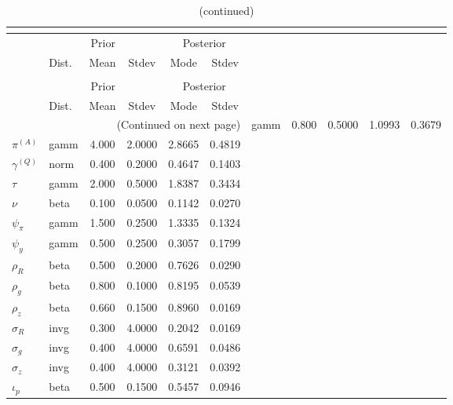  
\begin{center}
\begin{longtable}{llcccc} 
\caption{Results from posterior maximization (parameters)}\\
 \label{Table:Posterior:1}\\
\toprule 
  & \multicolumn{3}{c}{Prior}  &  \multicolumn{2}{c}{Posterior} \\
  \cmidrule(r{.75em}){2-4} \cmidrule(r{.75em}){5-6}
  & Dist. & Mean  & Stdev & Mode & Stdev \\ 
\midrule \endfirsthead 
\caption{(continued)}\\
 \bottomrule 
  & \multicolumn{3}{c}{Prior}  &  \multicolumn{2}{c}{Posterior} \\
  \cmidrule(r{.75em}){2-4} \cmidrule(r{.75em}){5-6}
  & Dist. & Mean  & Stdev & Mode & Stdev \\ 
\midrule \endhead 
\bottomrule \multicolumn{6}{r}{(Continued on next page)}\endfoot 
\bottomrule\endlastfoot 
${r_{A}}$ & gamm &   0.800 & 0.5000 &   1.0993 &  0.3679 \\ 
${\pi^{(A)}}$ & gamm &   4.000 & 2.0000 &   2.8665 &  0.4819 \\ 
${\gamma^{(Q)}}$ & norm &   0.400 & 0.2000 &   0.4647 &  0.1403 \\ 
${\tau}$ & gamm &   2.000 & 0.5000 &   1.8387 &  0.3434 \\ 
${\nu}$ & beta &   0.100 & 0.0500 &   0.1142 &  0.0270 \\ 
${\psi_\pi}$ & gamm &   1.500 & 0.2500 &   1.3335 &  0.1324 \\ 
${\psi_y}$ & gamm &   0.500 & 0.2500 &   0.3057 &  0.1799 \\ 
${\rho_R}$ & beta &   0.500 & 0.2000 &   0.7626 &  0.0290 \\ 
${\rho_{g}}$ & beta &   0.800 & 0.1000 &   0.8195 &  0.0539 \\ 
${\rho_z}$ & beta &   0.660 & 0.1500 &   0.8960 &  0.0169 \\ 
${\sigma_R}$ & invg &   0.300 & 4.0000 &   0.2042 &  0.0169 \\ 
${\sigma_{g}}$ & invg &   0.400 & 4.0000 &   0.6591 &  0.0486 \\ 
${\sigma_z}$ & invg &   0.400 & 4.0000 &   0.3121 &  0.0392 \\ 
${\iota_p}$ & beta &   0.500 & 0.1500 &   0.5457 &  0.0946 \\ 
\end{longtable}
 \end{center}
